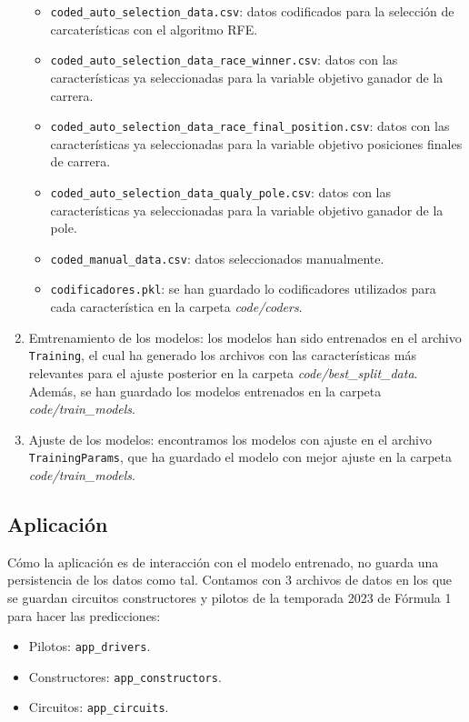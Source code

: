 \begin{enumerate}
        \begin{itemize}
            \item \texttt{coded\_auto\_selection\_data.csv}: datos codificados para la selección de carcaterísticas con el algoritmo RFE.
            \item \texttt{coded\_auto\_selection\_data\_race\_winner.csv}: datos con las características ya seleccionadas para la variable objetivo ganador de la carrera.
            \item \texttt{coded\_auto\_selection\_data\_race\_final\_position.csv}: datos con las características ya seleccionadas para la variable objetivo posiciones finales de carrera.
            \item \texttt{coded\_auto\_selection\_data\_qualy\_pole.csv}: datos con las características ya seleccionadas para la variable objetivo ganador de la pole.
            \item \texttt{coded\_manual\_data.csv}: datos seleccionados manualmente.
            \item \texttt{codificadores.pkl}: se han guardado lo codificadores utilizados para cada característica en la carpeta \textit{code/coders}.
        \end{itemize}
    \item Emtrenamiento de los modelos: los modelos han sido entrenados en el archivo \texttt{Training}, el cual ha generado los archivos con las características más relevantes para el ajuste posterior en la carpeta \textit{code/best\_split\_data}. Además, se han guardado los modelos entrenados en la carpeta \textit{code/train\_models}.
    \item Ajuste de los modelos: encontramos los modelos con ajuste en el archivo \texttt{TrainingParams}, que ha guardado el modelo con mejor ajuste en la carpeta \textit{code/train\_models}.
\end{enumerate}

\subsection{Aplicación}

Cómo la aplicación es de interacción con el modelo entrenado, no guarda una persistencia de los datos como tal. Contamos con 3 archivos de datos en los que se guardan circuitos constructores y pilotos de la temporada 2023 de Fórmula 1 para hacer las predicciones:
\begin{itemize}
    \item Pilotos: \texttt{app\_drivers}.
    \item Constructores: \texttt{app\_constructors}.
    \item Circuitos: \texttt{app\_circuits}.
\end{itemize}

